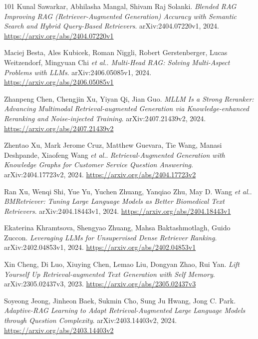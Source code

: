 \documentclass[11pt,a4paper]{article}
\begin{document}
\begin{thebibliography}{101}
Kunal Sawarkar, Abhilasha Mangal, Shivam Raj Solanki.
\newblock \emph{Blended RAG Improving RAG (Retriever-Augmented Generation) Accuracy with Semantic Search and Hybrid Query-Based Retrievers}.
\newblock arXiv:2404.07220v1, 2024.
\newblock \url{https://arxiv.org/abs/2404.07220v1}

Maciej Besta, Ales Kubicek, Roman Niggli, Robert Gerstenberger, Lucas Weitzendorf, Mingyuan Chi \emph{et al.}.
\newblock \emph{Multi-Head RAG: Solving Multi-Aspect Problems with LLMs}.
\newblock arXiv:2406.05085v1, 2024.
\newblock \url{https://arxiv.org/abs/2406.05085v1}

Zhanpeng Chen, Chengjin Xu, Yiyan Qi, Jian Guo.
\newblock \emph{MLLM Is a Strong Reranker: Advancing Multimodal Retrieval-augmented Generation via Knowledge-enhanced Reranking and Noise-injected Training}.
\newblock arXiv:2407.21439v2, 2024.
\newblock \url{https://arxiv.org/abs/2407.21439v2}

Zhentao Xu, Mark Jerome Cruz, Matthew Guevara, Tie Wang, Manasi Deshpande, Xiaofeng Wang \emph{et al.}.
\newblock \emph{Retrieval-Augmented Generation with Knowledge Graphs for Customer Service Question Answering}.
\newblock arXiv:2404.17723v2, 2024.
\newblock \url{https://arxiv.org/abs/2404.17723v2}

Ran Xu, Wenqi Shi, Yue Yu, Yuchen Zhuang, Yanqiao Zhu, May D. Wang \emph{et al.}.
\newblock \emph{BMRetriever: Tuning Large Language Models as Better Biomedical Text Retrievers}.
\newblock arXiv:2404.18443v1, 2024.
\newblock \url{https://arxiv.org/abs/2404.18443v1}

Ekaterina Khramtsova, Shengyao Zhuang, Mahsa Baktashmotlagh, Guido Zuccon.
\newblock \emph{Leveraging LLMs for Unsupervised Dense Retriever Ranking}.
\newblock arXiv:2402.04853v1, 2024.
\newblock \url{https://arxiv.org/abs/2402.04853v1}

Xin Cheng, Di Luo, Xiuying Chen, Lemao Liu, Dongyan Zhao, Rui Yan.
\newblock \emph{Lift Yourself Up Retrieval-augmented Text Generation with Self Memory}.
\newblock arXiv:2305.02437v3, 2023.
\newblock \url{https://arxiv.org/abs/2305.02437v3}

Soyeong Jeong, Jinheon Baek, Sukmin Cho, Sung Ju Hwang, Jong C. Park.
\newblock \emph{Adaptive-RAG Learning to Adapt Retrieval-Augmented Large Language Models through Question Complexity}.
\newblock arXiv:2403.14403v2, 2024.
\newblock \url{https://arxiv.org/abs/2403.14403v2}


\end{thebibliography}
\end{document}
